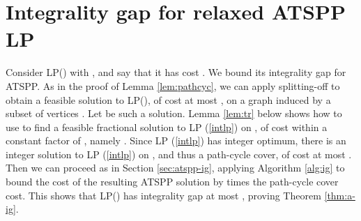 \documentclass[11pt]{article}
\begin{document}
\section{Integrality gap for relaxed ATSPP LP} \label{sec:atspp-alpha1}

Consider LP() 
with , and say that it has cost . We bound its integrality gap for ATSPP. 
As in the proof of Lemma \ref{lem:pathcyc}, we can apply splitting-off to obtain a feasible solution 
to LP(), of cost at most , on a graph induced by a subset of vertices . 
Let  be such a solution. Lemma \ref{lem:tr} below shows how to use  to find a feasible fractional 
solution to LP (\ref{intlp}) on , of cost within a constant factor of , namely . 
Since LP (\ref{intlp}) has integer optimum, there is an integer solution to  LP (\ref{intlp}) on , and thus a path-cycle cover,  
of cost at most . Then we can proceed as in Section \ref{sec:atspp-ig}, applying Algorithm \ref{alg:ig} to bound the cost of the resulting ATSPP solution by  times the path-cycle cover cost. This shows that LP() has integrality gap at most 
, proving Theorem \ref{thm:a-ig}.
\end{document}
